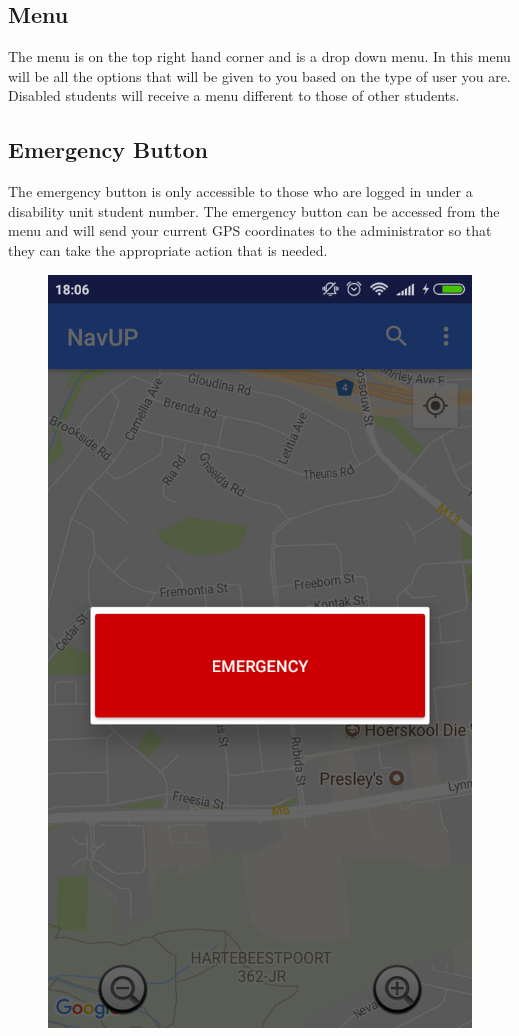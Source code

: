 \documentclass{article}
\begin{document}
\subsection{Menu}
The menu is on the top right hand corner and is a drop down menu. In this menu will be all the options that will be given to you based on the type of user you are. Disabled students will receive a menu different to those of other students. 

\subsection{Emergency Button}
The emergency button is only accessible to those who are logged in under a disability unit student number. The emergency button can be accessed from the menu and will send your current GPS coordinates to the administrator so that they can take the appropriate action that is needed.

\begin{figure}[h!]
\centering
\includegraphics[scale=0.2]{emergency.png}
\end{figure}
\end{document}
